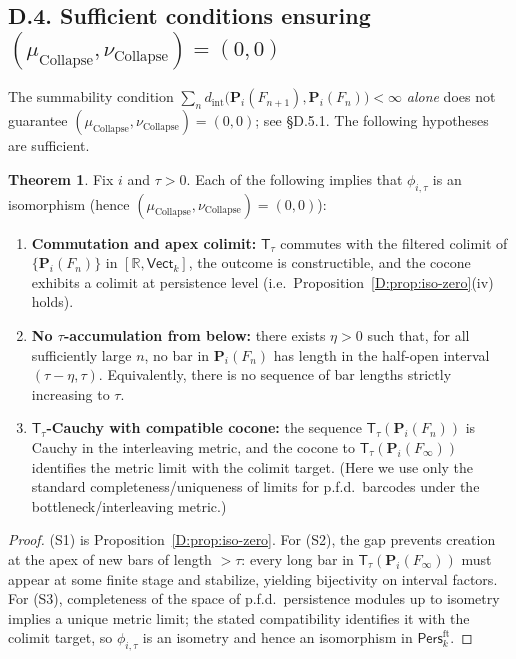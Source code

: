 \documentclass[11pt]{article}
\numberwithin{equation}{section}
\theoremstyle{plain}
\theoremstyle{definition}
\theoremstyle{remark}
\newcommand{\RR}{\mathbb{R}}
\newcommand{\Pers}{\mathsf{Pers}}
\newcommand{\Vect}{\mathsf{Vect}}
\newcommand{\T}{\mathsf{T}}
\theoremstyle{plain}
\theoremstyle{definition}
\numberwithin{equation}{section}
\newtheorem{theorem}{Theorem}[section]
\theoremstyle{definition}
\DeclareRobustCommand{\muc}{\mu_{\mathrm{Collapse}}}
\DeclareRobustCommand{\nuc}{\nu_{\mathrm{Collapse}}}
\numberwithin{equation}{section}
\theoremstyle{plain}
\theoremstyle{definition}
\theoremstyle{remark}
\newcommand{\Pfun}{\mathbf{P}}
\providecommand{\muc}{\mu_{\mathrm{Collapse}}}
\providecommand{\nuc}{\nu_{\mathrm{Collapse}}}
\begin{document}
\subsection*{D.4. Sufficient conditions ensuring \texorpdfstring{$(\muc,\nuc)=(0,0)$}{(mu,nu)=(0,0)}}

The summability condition \(\sum_{n} d_{\mathrm{int}}\!\big(\Pfun_i(F_{n+1}),\Pfun_i(F_n)\big)<\infty\) \emph{alone} does not guarantee \((\muc,\nuc)=(0,0)\); see §D.5.1.
The following hypotheses are sufficient.

\begin{theorem}\label{D:thm:sufficient}
Fix \(i\) and \(\tau>0\).
Each of the following implies that \(\phi_{i,\tau}\) is an isomorphism (hence \((\muc,\nuc)=(0,0)\)):
\begin{enumerate}[label=(S\arabic*)]
\item \textbf{Commutation and apex colimit:} \(\T_\tau\) commutes with the filtered colimit of \(\{\Pfun_i(F_n)\}\) in \([\RR,\Vect_k]\), the outcome is constructible, and the cocone exhibits a colimit at persistence level (i.e.\ Proposition~\ref{D:prop:iso-zero}(iv) holds).
\item \textbf{No \(\tau\)-accumulation from below:} there exists \(\eta>0\) such that, for all sufficiently large \(n\), no bar in \(\Pfun_i(F_n)\) has length in the half-open interval \((\tau-\eta,\tau)\).
Equivalently, there is no sequence of bar lengths strictly increasing to \(\tau\).
\item \textbf{\(\T_\tau\)-Cauchy with compatible cocone:} the sequence \(\T_\tau(\Pfun_i(F_n))\) is Cauchy in the interleaving metric, and the cocone to \(\T_\tau(\Pfun_i(F_\infty))\) identifies the metric limit with the colimit target.
(Here we use only the standard completeness/uniqueness of limits for p.f.d.\ barcodes under the bottleneck/interleaving metric.)
\end{enumerate}
\end{theorem}

\begin{proof}
(S1) is Proposition~\ref{D:prop:iso-zero}.
For (S2), the gap prevents creation at the apex of new bars of length \(>\tau\):
every long bar in \(\T_\tau(\Pfun_i(F_\infty))\) must appear at some finite stage and stabilize, yielding bijectivity on interval factors.
For (S3), completeness of the space of p.f.d.\ persistence modules up to isometry implies a unique metric limit; the stated compatibility identifies it with the colimit target, so \(\phi_{i,\tau}\) is an isometry and hence an isomorphism in \(\Pers^{\mathrm{ft}}_k\).
\end{proof}
\end{document}
